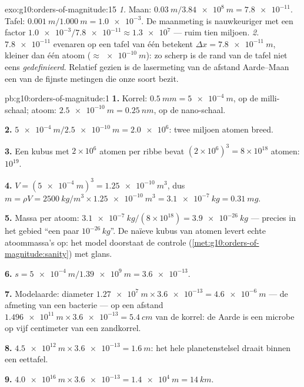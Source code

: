 \begin{solution}{exo:g10:orders-of-magnitude:15}
\emph{1.} Maan: $\qty{0.03}{m}/\qty{3.84e8}{m} = \num{7.8e-11}$.
Tafel: $\qty{0.001}{m}/\qty{1.000}{m} = \num{1.0e-3}$. De maanmeting
is nauwkeuriger met een factor
$\num{1.0e-3}/\num{7.8e-11} \approx \num{1.3e7}$ --- ruim tien
miljoen.
\emph{2.} $\num{7.8e-11}$ evenaren op een tafel van één  betekent
$\Delta x = \qty{7.8e-11}{m}$, kleiner dan één atoom
($\approx \qty{e-10}{m}$): zo scherp is de rand van de tafel niet eens
\emph{gedefinieerd}. Relatief gezien is de lasermeting van de afstand
Aarde--Maan een van de fijnste metingen die onze soort bezit.
\end{solution}

\begin{solution}{pb:g10:orders-of-magnitude:1}
\textbf{1.} Korrel: $\qty{0.5}{mm} = \qty{5e-4}{m}$, op de
milli-schaal; atoom: $\qty{2.5e-10}{m} = \qty{0.25}{nm}$, op de
nano-schaal.

\textbf{2.} $\qty{5e-4}{m}/\qty{2.5e-10}{m} = \num{2.0e6}$: twee
miljoen atomen breed.

\textbf{3.} Een kubus met $2 \times 10^{6}$ atomen per ribbe bevat
$(2\times10^{6})^{3} = 8 \times 10^{18}$ atomen: 
$10^{19}$.

\textbf{4.} $V = (\qty{5e-4}{m})^{3} = \qty{1.25e-10}{m^3}$, dus
$m = \rho V = \qty{2500}{kg/m^3} \times \qty{1.25e-10}{m^3}
= \qty{3.1e-7}{kg} = \qty{0.31}{mg}$.

\textbf{5.} Massa per atoom:
$\qty{3.1e-7}{kg}/(8\times10^{18}) = \qty{3.9e-26}{kg}$ --- precies in
het gebied ``een paar $10^{-26}\,\unit{kg}$''. De naïeve kubus van
atomen levert echte atoommassa's op: het model doorstaat de controle
(\cref{met:g10:orders-of-magnitude:sanity}) met glans.

\textbf{6.} $s = \qty{5e-4}{m}/\qty{1.39e9}{m} = \num{3.6e-13}$.

\textbf{7.} Modelaarde: diameter
$\qty{1.27e7}{m} \times \num{3.6e-13} = \qty{4.6e-6}{m}$ --- de
afmeting van een bacterie --- op een afstand
$\qty{1.496e11}{m} \times \num{3.6e-13} = \qty{5.4}{cm}$ van de
korrel: de Aarde is een microbe op vijf centimeter van een zandkorrel.

\textbf{8.} $\qty{4.5e12}{m} \times \num{3.6e-13} = \qty{1.6}{m}$: het
hele planetenstelsel draait binnen een eettafel.

\textbf{9.} $\qty{4.0e16}{m} \times \num{3.6e-13} = \qty{1.4e4}{m}
= \qty{14}{km}$.


\end{solution}
